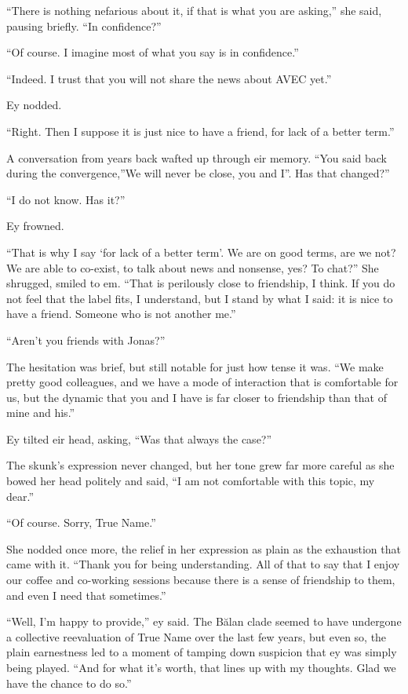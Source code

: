 ``There is nothing nefarious about it, if that is what you are asking,'' she said, pausing briefly. ``In confidence?''

``Of course. I imagine most of what you say is in confidence.''

``Indeed. I trust that you will not share the news about AVEC yet.''

Ey nodded.

``Right. Then I suppose it is just nice to have a friend, for lack of a better term.''

A conversation from years back wafted up through eir memory. ``You said back during the convergence,''We will never be close, you and I''. Has that changed?''

``I do not know. Has it?''

Ey frowned.

``That is why I say `for lack of a better term'. We are on good terms, are we not? We are able to co-exist, to talk about news and nonsense, yes? To chat?'' She shrugged, smiled to em. ``That is perilously close to friendship, I think. If you do not feel that the label fits, I understand, but I stand by what I said: it is nice to have a friend. Someone who is not another me.''

``Aren't you friends with Jonas?''

The hesitation was brief, but still notable for just how tense it was. ``We make pretty good colleagues, and we have a mode of interaction that is comfortable for us, but the dynamic that you and I have is far closer to friendship than that of mine and his.''

Ey tilted eir head, asking, ``Was that always the case?''

The skunk's expression never changed, but her tone grew far more careful as she bowed her head politely and said, ``I am not comfortable with this topic, my dear.''

``Of course. Sorry, True Name.''

She nodded once more, the relief in her expression as plain as the exhaustion that came with it. ``Thank you for being understanding. All of that to say that I enjoy our coffee and co-working sessions because there is a sense of friendship to them, and even I need that sometimes.''

``Well, I'm happy to provide,'' ey said. The Bălan clade seemed to have undergone a collective reevaluation of True Name over the last few years, but even so, the plain earnestness led to a moment of tamping down suspicion that ey was simply being played. ``And for what it's worth, that lines up with my thoughts. Glad we have the chance to do so.''

